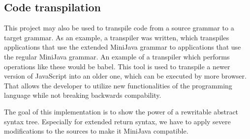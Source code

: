 
\subsection{Code transpilation}

This project may also be used to transpile code from a source grammar to a target grammar. As an example, a transpiler was written, which transpiles applications that use
the extended MiniJava grammar to applications that use the regular MiniJava grammar. An example of a transpiler which performs operations like these would be babel. This tool is
used to transpile a newer version of JavaScript into an older one, which can be executed by more browser. That allows the developer to utilize new functionalities of the programming language while not breaking backwards compability.

The goal of this implementation is to show the power of a rewritable abstract syntax tree. Especially for extended return syntax, we have to apply severe modifications to the sources
to make it MiniJava compatible.